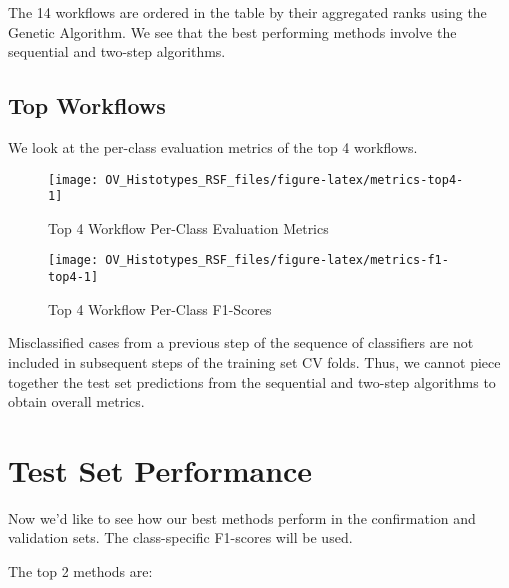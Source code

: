 \documentclass[
]{report}
\begin{document}
The 14 workflows are ordered in the table by their aggregated ranks using the Genetic Algorithm. We see that the best performing methods involve the sequential and two-step algorithms.

\hypertarget{top-workflows}{%
\subsection{Top Workflows}\label{top-workflows}}

We look at the per-class evaluation metrics of the top 4 workflows.

\begin{figure}[H]

{\centering \texttt{[image: OV\_Histotypes\_RSF\_files/figure-latex/metrics-top4-1]} 

}

\caption{Top 4 Workflow Per-Class Evaluation Metrics}\label{fig:metrics-top4}
\end{figure}

\begin{figure}[H]

{\centering \texttt{[image: OV\_Histotypes\_RSF\_files/figure-latex/metrics-f1-top4-1]} 

}

\caption{Top 4 Workflow Per-Class F1-Scores}\label{fig:metrics-f1-top4}
\end{figure}

Misclassified cases from a previous step of the sequence of classifiers are not included in subsequent steps of the training set CV folds. Thus, we cannot piece together the test set predictions from the sequential and two-step algorithms to obtain overall metrics.

\hypertarget{test-set-performance}{%
\section{Test Set Performance}\label{test-set-performance}}

Now we'd like to see how our best methods perform in the confirmation and validation sets. The class-specific F1-scores will be used.

The top 2 methods are:
\end{document}
